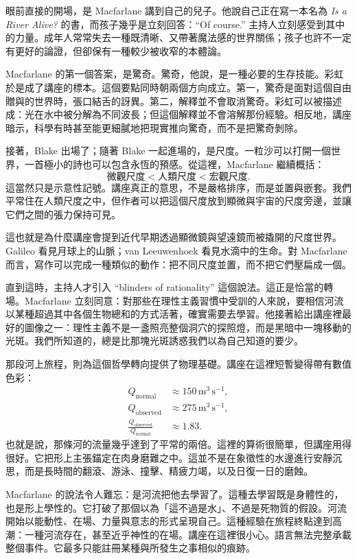 眼前直接的開場，是 Macfarlane 講到自己的兒子。他說自己正在寫一本名為 \emph{Is a River Alive?} 的書，而孩子幾乎是立刻回答：``Of course.'' 主持人立刻感受到其中的力量。成年人常常失去一種既清晰、又帶著魔法感的世界關係；孩子也許不一定有更好的論證，但卻保有一種較少被收窄的本體論。

Macfarlane 的第一個答案，是驚奇。驚奇，他說，是一種必要的生存技能。彩虹於是成了講座的標本。這個要點同時朝兩個方向成立。第一，驚奇是面對這個自由贈與的世界時，張口結舌的訝異。第二，解釋並不會取消驚奇。彩虹可以被描述成：光在水中被分解為不同波長；但這個解釋並不會溶解那份經驗。相反地，講座暗示，科學有時甚至能更細膩地把現實推向驚奇，而不是把驚奇剝除。

接著，Blake 出場了；隨著 Blake 一起進場的，是尺度。一粒沙可以打開一個世界，一首極小的詩也可以包含永恆的預感。從這裡，Macfarlane 繼續概括：
\begin{equation}
\text{微觀尺度} < \text{人類尺度} < \text{宏觀尺度}.
\end{equation}
這當然只是示意性記號。講座真正的意思，不是嚴格排序，而是並置與嵌套。我們平常住在人類尺度之中，但作者可以把這個尺度放到顯微與宇宙的尺度旁邊，並讓它們之間的張力保持可見。

這也就是為什麼講座會提到近代早期透過顯微鏡與望遠鏡而被撬開的尺度世界。Galileo 看見月球上的山脈；van Leeuwenhoek 看見水滴中的生命。對 Macfarlane 而言，寫作可以完成一種類似的動作：把不同尺度並置，而不把它們壓扁成一個。

直到這時，主持人才引入 ``blinders of rationality'' 這個說法。這正是恰當的轉場。Macfarlane 立刻同意：對那些在理性主義習慣中受訓的人來說，要相信河流以某種超過其中各個生物總和的方式活著，確實需要去學習。他接著給出講座裡最好的圖像之一：理性主義不是一盞照亮整個洞穴的探照燈，而是黑暗中一塊移動的光斑。我們所知道的，總是比那塊光斑誘惑我們以為自己知道的要少。

那段河上旅程，則為這個哲學轉向提供了物理基礎。講座在這裡短暫變得帶有數值色彩：
\begin{align}
Q_{\text{normal}} &\approx 150\,\mathrm{m^3\,s^{-1}},\\
Q_{\text{observed}} &\approx 275\,\mathrm{m^3\,s^{-1}},\\
\frac{Q_{\text{observed}}}{Q_{\text{normal}}} &\approx 1.83.
\end{align}
也就是說，那條河的流量幾乎達到了平常的兩倍。這裡的算術很簡單，但講座用得很好。它把形上主張錨定在肉身磨難之中。這並不是在象徵性的水邊進行安靜沉思，而是長時間的翻滾、游泳、撞擊、精疲力竭，以及日復一日的磨蝕。

Macfarlane 的說法令人難忘：是河流把他去學習了。這種去學習既是身體性的，也是形上學性的。它打破了那個以為「這不過是水」、不過是死物質的假設。河流開始以能動性、在場、力量與意志的形式呈現自己。這種經驗在旅程終點達到高潮：一種河流存在，甚至近乎神性的在場。講座在這裡很小心。語言無法完整承載整個事件。它最多只能註冊某種與所發生之事相似的痕跡。

